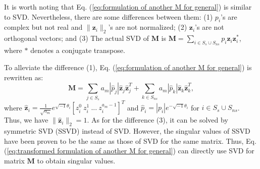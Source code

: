 \documentclass[journal,onecolumn,11pt]{IEEEtran}
\begin{document}
It is worth noting that Eq. (\ref{eq:formulation of another M for general}) is similar to SVD.
Nevertheless, there are some differences between them:
(1) $p_{i}$'s are complex but not real and $\|\bm{z}_{i}\|_{2}$'s are not normalized;
(2) $\bm{z}_{i}$'s are not orthogonal vectors; and
(3) The actual SVD of $\bm{M}$ is $\bm{M}=\sum_{i \in S_{s}\cup S_{ns}}p_{i}\bm{z}_{i}\bm{z}_{i}^{*}$, where $*$ denotes a conjugate transpose.

To alleviate the difference (1), Eq. (\ref{eq:formulation of another M for general}) is rewritten as:
\small
\begin{equation}
\bm{M}=\sum_{j \in S_s} a_{m}|\hat{p}_{j}|\hat{\bm{z}}_{j}\hat{\bm{z}}_{j}^{T}+\sum_{k \in S_{ns}} a_{m}|\hat{p}_{k}|\hat{\bm{z}}_{k}\hat{\bm{z}}_{k}^{T},
\label{eq:transformed formulation of another M for general}
\end{equation}
\normalsize
where $  \hat{\bm{z}}_{i} = \frac{1}{\sqrt{a_{m}}}e^{\sqrt{-1}\theta_{i}}[ z_{i}^{0} \ z_{i}^{1} \ ... \ z_{i}^{a_{m}-1}   ]^{T}$ and $\hat{p}_{i}= |p_{i}|e^{-\sqrt{-1}\theta_{i}}$ for $i \in S_{s}\cup S_{ns}$.
Thus, we have $\| \hat{\bm{z}}_{i} \|_{2} =1$.
As for the difference (3), it can be solved by symmetric SVD (SSVD) \cite{Angelika1988} instead of SVD.
However, the singular values of SSVD have been proven to be the same as those of SVD for the same matrix.
Thus, Eq. (\ref{eq:transformed formulation of another M for general}) can directly use SVD for matrix $\bm{M}$ to obtain singular values.
\end{document}

